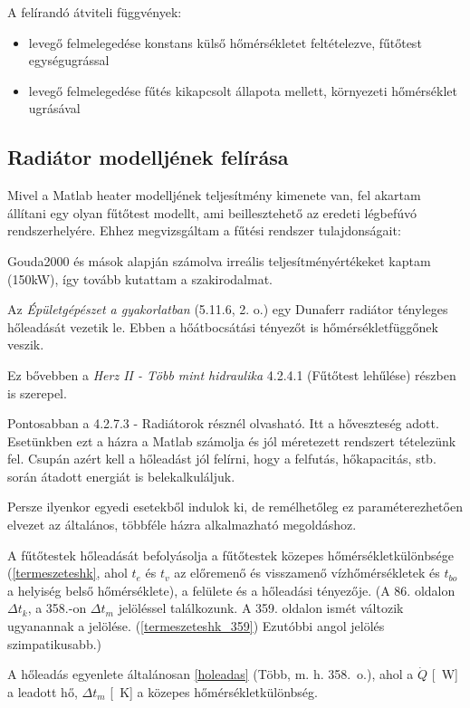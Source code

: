 A felírandó átviteli függvények:

\begin{itemize}[noitemsep,topsep=0pt,parsep=0pt,partopsep=0pt]
	\item levegő felmelegedése konstans külső hőmérsékletet feltételezve, fűtőtest egységugrással
	\item levegő felmelegedése fűtés kikapcsolt állapota mellett, környezeti hőmérséklet ugrásával
\end{itemize}


\subsection{Radiátor modelljének felírása}

Mivel a Matlab heater modelljének teljesítmény kimenete van, fel akartam állítani egy olyan fűtőtest modellt, ami beillesztehető az eredeti légbefúvó rendszerhelyére. Ehhez megvizsgáltam a fűtési rendszer tulajdonságait:


Gouda2000 és mások alapján számolva irreális teljesítményértékeket kaptam (150kW), így tovább kutattam a szakirodalmat.

Az \textit{Épületgépészet a gyakorlatban} (5.11.6, 2. o.) egy Dunaferr radiátor tényleges hőleadását vezetik le. Ebben a hőátbocsátási tényezőt is hőmérsékletfüggőnek veszik.

Ez bővebben a \textit{Herz II - Több mint hidraulika} 4.2.4.1 (Fűtőtest lehűlése) részben is szerepel.

Pontosabban a 4.2.7.3 - Radiátorok résznél olvasható. Itt a hőveszteség adott. Esetünkben ezt a házra a Matlab számolja és jól méretezett rendszert tételezünk fel. Csupán azért kell a hőleadást jól felírni, hogy a felfutás, hőkapacitás, stb. során átadott energiát is belekalkuláljuk.

Persze ilyenkor egyedi esetekből indulok ki, de remélhetőleg ez paraméterezhetően elvezet az általános, többféle házra alkalmazható megoldáshoz.

A fűtőtestek hőleadását befolyásolja a fűtőtestek közepes hőmérsékletkülönbsége (\ref{termeszeteshk}, ahol $t_e$ és $t_v$ az előremenő és visszamenő vízhőmérsékletek és  $t_{bo}$ a helyiség belső hőmérséklete), a felülete és a hőleadási tényezője. (A 86. oldalon $\Delta t_k$, a 358.-on $\Delta t_m$ jelöléssel találkozunk. A 359. oldalon ismét változik ugyanannak a jelölése. (\ref{termeszeteshk_359}) Ezutóbbi angol jelölés szimpatikusabb.)

A hőleadás egyenlete általánosan \ref{holeadas} (Több, m. h. 358.~o.), ahol a $\dot{Q}$ [\SI{}{\watt}] a leadott hő, $\Delta t_m$ [\SI{}{\kelvin}] a közepes hőmérsékletkülönbség.




